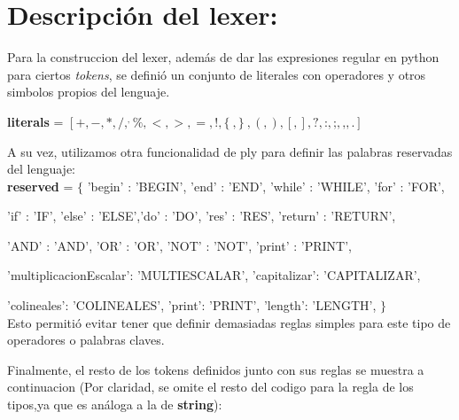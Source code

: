 \section{Descripción del lexer:}

Para la construccion del lexer, además de dar las expresiones regular en python para ciertos \textit{tokens}, se definió un conjunto de literales con operadores y otros simbolos propios del lenguaje.

\textbf{literals} = $[+,- , * , / , ^ ,\% , < , > , = , ! , \{\ , \}\ , ( , ) , [ , ] , ? , \textbf{:} , \textbf{;} , \textbf{,} , \textbf{.} ]$

A su vez, utilizamos otra funcionalidad de ply para definir las palabras reservadas del lenguaje: \\

\textbf{reserved} = $\{$
'begin' : 'BEGIN', 'end' : 'END', 'while' : 'WHILE', 'for' : 'FOR',

'if' : 'IF', 'else' : 'ELSE','do' : 'DO', 'res' : 'RES', 'return' : 'RETURN',

'AND' : 'AND', 'OR' : 'OR', 'NOT' : 'NOT', 'print' : 'PRINT',

'multiplicacionEscalar': 'MULTIESCALAR', 'capitalizar': 'CAPITALIZAR', 

'colineales': 'COLINEALES', 'print': 'PRINT', 'length': 'LENGTH',
$\}$ \\

Esto permitió evitar tener que definir demasiadas reglas simples para este tipo de operadores o palabras claves.

Finalmente, el resto de los tokens definidos junto con sus reglas se muestra a continuacion (Por claridad, se omite el resto del codigo para la regla de los tipos,ya que  es análoga a la de \textbf{string}):

